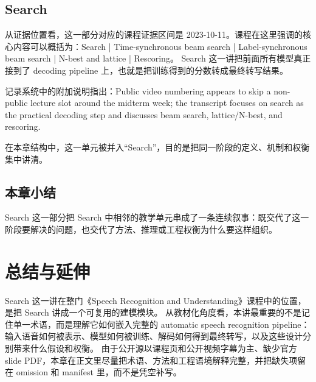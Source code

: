 \documentclass[a4paper]{article}
\begin{document}
\subsection{Search}
从证据位置看，这一部分对应的课程证据区间是 2023-10-11。课程在这里强调的核心内容可以概括为：Search | Time-synchronous beam search | Label-synchronous beam search | N-best and lattice | Rescoring。
Search 这一讲把前面所有模型真正接到了 decoding pipeline 上，也就是把训练得到的分数转成最终转写结果。

记录系统中的附加说明指出：Public video numbering appears to skip a non-public lecture slot around the midterm week; the transcript focuses on search as the practical decoding step and discusses beam search, lattice/N-best, and rescoring.

在本章结构中，这一单元被并入“Search”，目的是把同一阶段的定义、机制和权衡集中讲清。

\subsection{本章小结}
Search 这一部分把 Search 中相邻的教学单元串成了一条连续叙事：既交代了这一阶段要解决的问题，也交代了方法、推理或工程权衡为什么要这样组织。

\section{总结与延伸}
Search 这一讲在整门《Speech Recognition and Understanding》课程中的位置，是把 Search 讲成一个可复用的建模模块。
从教材化角度看，本讲最重要的不是记住单一术语，而是理解它如何嵌入完整的 automatic speech recognition pipeline：输入语音如何被表示、模型如何被训练、解码如何得到最终转写，以及这些设计分别带来什么假设和权衡。
由于公开源以课程页和公开视频字幕为主、缺少官方 slide PDF，本章在正文里尽量把术语、方法和工程语境解释完整，并把缺失项留在 omission 和 manifest 里，而不是凭空补写。
\end{document}
